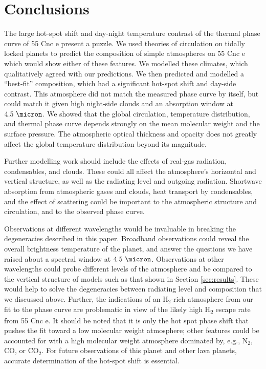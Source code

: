 


\section{Conclusions}


The large hot-spot shift and day-night temperature contrast of the thermal phase curve of 55 Cnc e present a puzzle. We used theories of circulation on tidally locked planets to predict the composition of simple atmospheres on 55 Cnc e which would show either of these features. We modelled these climates, which qualitatively agreed with our predictions. We then predicted and modelled a ``best-fit'' composition, which had a significant hot-spot shift and day-side contrast. This atmosphere did not match the measured phase curve by itself, but could match it given high night-side clouds and an absorption window at $4.5\ \micron$. We showed that the global circulation, temperature distribution, and thermal phase curve depends strongly on the mean molecular weight and the surface pressure. The atmospheric optical thickness and opacity does not greatly affect the global temperature distribution beyond its magnitude.

Further modelling work should include the effects of real-gas radiation, condensables, and clouds. These could all affect the atmosphere's horizontal and vertical structure, as well as the radiating level and outgoing radiation. Shortwave absorption from atmospheric gases and clouds, heat transport by condensables, and the effect of scattering could be important to the atmospheric structure and circulation, and to the observed phase curve.

Observations at different wavelengths would be invaluable in breaking the degeneracies described in this paper. Broadband observations could reveal the overall brightness temperature of the planet, and answer the questions we have raised about a spectral window at $4.5\ \micron$. Observations at other wavelengths could probe different levels of the atmosphere and be compared to the vertical structure of models such as that shown in Section \ref{sec:results}. These would help to solve the degeneracies between radiating level and composition that we discussed above. Further, the indications of an $\mathrm{H_2}$-rich atmosphere from our fit to the phase curve are problematic in view of the likely high H\textsubscript{2} escape rate from 55 Cnc e.  It should be noted that it is only the hot spot phase shift that pushes the fit toward a low molecular weight atmosphere; other features could be accounted for with a high molecular weight atmosphere dominated by, e.g., $\mathrm{N_2}$, $\mathrm{CO}$, or $\mathrm{CO_2}$. For future observations of this planet and other lava planets, accurate determination of the hot-spot shift is essential.


